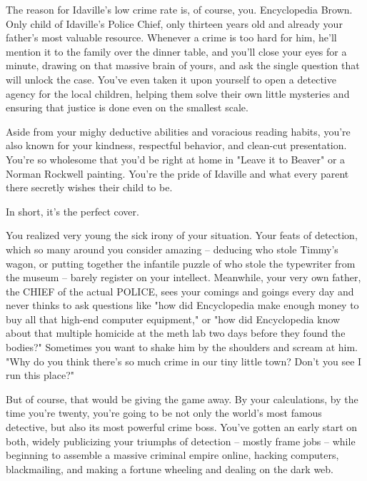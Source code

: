 \documentclass[char]{guildcamp4}
\begin{document}
\name{\cEncyclopedia{}}


The reason for Idaville's low crime rate is, of course, you. Encyclopedia Brown. Only child of Idaville's Police Chief, only thirteen years old and already your father's most valuable resource. Whenever a crime is too hard for him, he'll mention it to the family over the dinner table, and you'll close your eyes for a minute, drawing on that massive brain of yours, and ask the single question that will unlock the case. You've even taken it upon yourself to open a detective agency for the local children, helping them solve their own little mysteries and ensuring that justice is done even on the smallest scale.

Aside from your mighy deductive abilities and voracious reading habits, you're also known for your kindness, respectful behavior, and clean-cut presentation. You're so wholesome that you'd be right at home in "Leave it to Beaver" or a Norman Rockwell painting. You're the pride of Idaville and what every parent there secretly wishes their child to be.

In short, it's the perfect cover.

You realized very young the sick irony of your situation. Your feats of detection, which so many around you consider amazing -- deducing who stole Timmy's wagon, or putting together the infantile puzzle of who stole the typewriter from the museum -- barely register on your intellect. Meanwhile, your very own father, the CHIEF of the actual POLICE, sees your comings and goings every day and never thinks to ask questions like "how did Encyclopedia make enough money to buy all that high-end computer equipment," or "how did Encyclopedia know about that multiple homicide at the meth lab two days before they found the bodies?" Sometimes you want to shake him by the shoulders and scream at him. "Why do you think there's so much crime in our tiny little town? Don't you see I run this place?"

But of course, that would be giving the game away. By your calculations, by the time you're twenty, you're going to be not only the world's most famous detective, but also its most powerful crime boss. You've gotten an early start on both, widely publicizing your triumphs of detection -- mostly frame jobs -- while beginning to assemble a massive criminal empire online, hacking computers, blackmailing, and making a fortune wheeling and dealing on the dark web.
\end{document}
